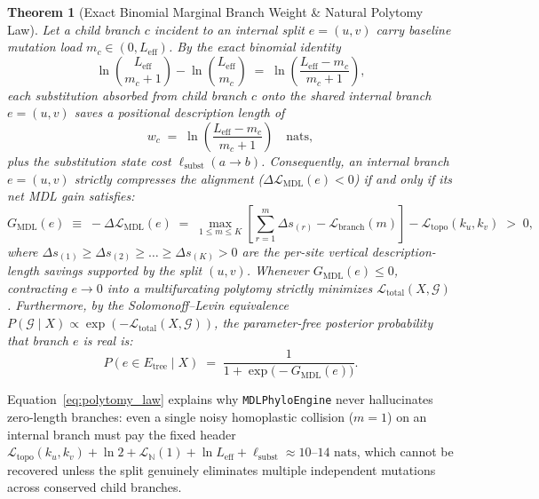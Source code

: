 \documentclass[11pt,a4paper]{article}
\newtheorem{theorem}{Theorem}
\begin{document}
\begin{theorem}[Exact Binomial Marginal Branch Weight \& Natural Polytomy Law]
\label{thm:marginal_weight}
Let a child branch $c$ incident to an internal split $e = (u,v)$ carry baseline mutation load $m_c \in (0, L_{\text{eff}})$. By the exact binomial identity
\begin{equation}
    \ln\binom{L_{\text{eff}}}{m_c + 1} - \ln\binom{L_{\text{eff}}}{m_c} \;=\; \ln\left(\frac{L_{\text{eff}} - m_c}{m_c + 1}\right),
\end{equation}
each substitution absorbed from child branch $c$ onto the shared internal branch $e=(u,v)$ saves a positional description length of
\begin{equation}
    w_c \;=\; \ln\left(\frac{L_{\text{eff}} - m_c}{m_c + 1}\right) \quad \text{nats},
    \label{eq:wc}
\end{equation}
plus the substitution state cost $\ell_{\text{subst}}(a \to b)$. Consequently, an internal branch $e = (u,v)$ strictly compresses the alignment ($\Delta\mathcal{L}_{\text{MDL}}(e) < 0$) if and only if its net MDL gain satisfies:
\begin{equation}
    G_{\text{MDL}}(e) \;\equiv\; -\Delta\mathcal{L}_{\text{MDL}}(e) \;=\; \max_{1 \le m \le K} \left[ \sum_{r=1}^{m} \Delta s_{(r)} - \mathcal{L}_{\text{branch}}(m) \right] - \mathcal{L}_{\text{topo}}(k_u, k_v) \;>\; 0,
    \label{eq:polytomy_law}
\end{equation}
where $\Delta s_{(1)} \ge \Delta s_{(2)} \ge \dots \ge \Delta s_{(K)} > 0$ are the per-site vertical description-length savings supported by the split $(u,v)$. Whenever $G_{\text{MDL}}(e) \le 0$, contracting $e \to 0$ into a multifurcating polytomy strictly minimizes $\mathcal{L}_{\text{total}}(X, \mathcal{G})$. Furthermore, by the Solomonoff--Levin equivalence $P(\mathcal{G} \mid X) \propto \exp(-\mathcal{L}_{\text{total}}(X, \mathcal{G}))$, the parameter-free posterior probability that branch $e$ is real is:
\begin{equation}
    P(e \in E_{\text{tree}} \mid X) \;=\; \frac{1}{1 + \exp\big(-G_{\text{MDL}}(e)\big)}.
\end{equation}
\end{theorem}

Equation~\eqref{eq:polytomy_law} explains why \texttt{MDLPhyloEngine} never hallucinates zero-length branches: even a single noisy homoplastic collision ($m=1$) on an internal branch must pay the fixed header $\mathcal{L}_{\text{topo}}(k_u, k_v) + \ln 2 + \mathcal{L}_{\mathbb{N}}(1) + \ln L_{\text{eff}} + \ell_{\text{subst}} \approx 10\text{--}14\text{ nats}$, which cannot be recovered unless the split genuinely eliminates multiple independent mutations across conserved child branches.
\end{document}
